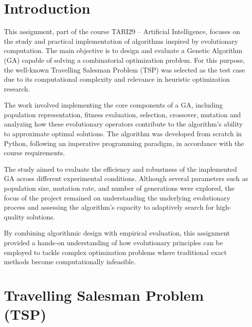 \documentclass{scrartcl}
\title{\reportname}
\subtitle{An Evolutionary Algorithm for the Travelling Salesman Problem}
\author{Filip Sjögren\and Jesper Claesson\and Joakim Möll\and Murillo Moraes Giroldo\and Sebastian Andersson \and}
\date{\today}
\begin{document}
\maketitle



\section{Introduction}
\label{sec:intro}

This assignment, part of the course TARI29 – Artificial Intelligence, focuses on the study and practical implementation of algorithms inspired by evolutionary computation. The main objective is to design and evaluate a Genetic Algorithm (GA) capable of solving a combinatorial optimization problem. For this purpose, the well-known Travelling Salesman Problem (TSP) was selected as the test case due to its computational complexity and relevance in heuristic optimization research.

The work involved implementing the core components of a GA, including population representation, fitness evaluation, selection, crossover,  mutation and analyzing how these evolutionary operators contribute to the algorithm’s ability to approximate optimal solutions. The algorithm was developed from scratch in Python, following an imperative programming paradigm, in accordance with the course requirements.

The study aimed to evaluate the efficiency and robustness of the implemented GA across different experimental conditions. Although several parameters such as population size, mutation rate, and number of generations were explored, the focus of the project remained on understanding the underlying evolutionary process and assessing the algorithm’s capacity to adaptively search for high-quality solutions.

By combining algorithmic design with empirical evaluation, this assignment provided a hands-on understanding of how evolutionary principles can be employed to tackle complex optimization problems where traditional exact methods become computationally infeasible.



\section{Travelling Salesman Problem (TSP)}

\label{sec:problem_description}
\end{document}
